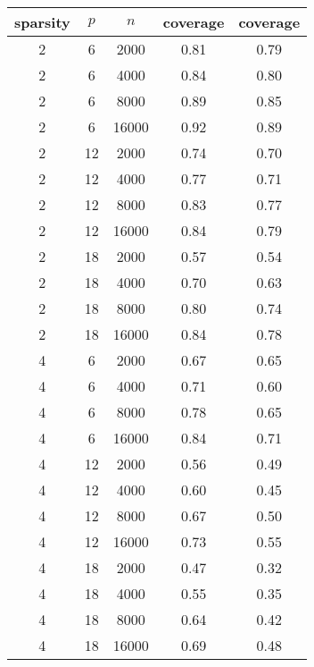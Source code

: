 \begin{table}[ht]
\centering
\begin{tabular}{|ccc|cc|}
  \hline
\hline
sparsity & $p$ & $n$ & coverage & coverage \\ 
  \hline
\hline
2 & 6 & 2000 & 0.81 & 0.79 \\ 
  2 & 6 & 4000 & 0.84 & 0.80 \\ 
  2 & 6 & 8000 & 0.89 & 0.85 \\ 
  2 & 6 & 16000 & 0.92 & 0.89 \\ 
   \hline
2 & 12 & 2000 & 0.74 & 0.70 \\ 
  2 & 12 & 4000 & 0.77 & 0.71 \\ 
  2 & 12 & 8000 & 0.83 & 0.77 \\ 
  2 & 12 & 16000 & 0.84 & 0.79 \\ 
   \hline
2 & 18 & 2000 & 0.57 & 0.54 \\ 
  2 & 18 & 4000 & 0.70 & 0.63 \\ 
  2 & 18 & 8000 & 0.80 & 0.74 \\ 
  2 & 18 & 16000 & 0.84 & 0.78 \\ 
   \hline
\hline
4 & 6 & 2000 & 0.67 & 0.65 \\ 
  4 & 6 & 4000 & 0.71 & 0.60 \\ 
  4 & 6 & 8000 & 0.78 & 0.65 \\ 
  4 & 6 & 16000 & 0.84 & 0.71 \\ 
   \hline
4 & 12 & 2000 & 0.56 & 0.49 \\ 
  4 & 12 & 4000 & 0.60 & 0.45 \\ 
  4 & 12 & 8000 & 0.67 & 0.50 \\ 
  4 & 12 & 16000 & 0.73 & 0.55 \\ 
   \hline
4 & 18 & 2000 & 0.47 & 0.32 \\ 
  4 & 18 & 4000 & 0.55 & 0.35 \\ 
  4 & 18 & 8000 & 0.64 & 0.42 \\ 
  4 & 18 & 16000 & 0.69 & 0.48 \\ 
   \hline
\hline
\end{tabular}
\end{table}

